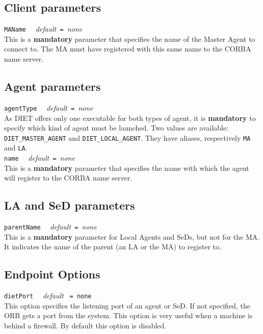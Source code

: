\subsection{Client parameters}

\noindent
\texttt{MAName} \ \ \emph{default}\texttt{ = }\emph{none}\\ This is a
\textbf{mandatory} parameter that specifies the name of the Master
Agent to connect to. The MA must have registered with this same name
to the CORBA name server.


\subsection{Agent parameters}

\noindent
\texttt{agentType} \ \ \emph{default}\texttt{ = }\emph{none}\\
As DIET offers only one executable for both types of agent, it is
\textbf{mandatory} to specify which kind of agent must be launched. Two values
are available: \texttt{DIET\_MASTER\_AGENT} and \texttt{DIET\_LOCAL\_AGENT}.
They have aliases, respectively \texttt{MA} and \texttt{LA}.
\\

\noindent
\texttt{name} \ \ \emph{default}\texttt{ = }\emph{none}\\ This is a
\textbf{mandatory} parameter that specifies the name with which the
agent will register to the CORBA name server.


\subsection{LA and SeD parameters}

\noindent
\texttt{parentName} \ \ \emph{default}\texttt{ = }\emph{none}\\ This
is a \textbf{mandatory} parameter for Local Agents and SeDs, but 
not for the MA.  It indicates the name of the parent (an LA or the
MA) to register to.

\subsection{Endpoint Options}

\noindent
\texttt{dietPort} \ \ \emph{default} \texttt{ = none }\\ This
option specifies the listening port of an agent or SeD. If not
specified, the ORB gets a port from the system. This option is very
useful when a machine is behind a firewall. By default this option
is disabled.\\

